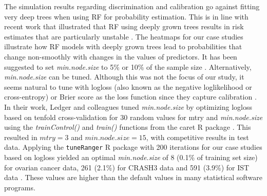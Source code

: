 The simulation results regarding discrimination and calibration go against
fitting very deep trees when using \gls{RF} for probability estimation. This is in
line with recent work that illustrated that \gls{RF} using deeply grown trees results
in risk estimates that are particularly unstable
 \cite{rileyStabilityClinicalPrediction2023}. The heatmaps for our case studies
illustrate how \gls{RF} models with deeply grown trees lead to probabilities that
change non-smoothly with changes in the values of predictors. It has been
suggested to set \textit{min.node.size} to 5\% or 10\% of the sample size
 \cite{malleyProbabilityMachinesConsistent2012,kruppaConsumerCreditRisk2013}.
Alternatively, \textit{min.node.size} can be tuned. Although this was not the
focus of our study, it seems natural to tune with logloss (also known as the
negative loglikelihood or cross-entropy) or Brier score as the loss function
since they capture calibration
 \cite{probstHyperparametersTuningStrategies2019}. In their work, Ledger and
colleagues tuned \textit{min.node.size} by optimizing logloss based on tenfold
cross-validation for 30 random values for mtry and \textit{min.node.size} using
the \textit{trainControl()} and \textit{train()} functions from the caret R package
 \cite{ledgerMulticlassRiskModels2023}. This resulted in $\textit{mtry} = 3$ and
$\textit{min.node.size} = 15$, with competitive results in test data. Applying
the \texttt{tuneRanger} R package with 200 iterations for our case studies based on
logloss yielded an optimal \textit{min.node.size} of 8 (0.1\% of training set
size) for ovarian cancer data, 261 (2.1\%) for \gls{CRASH}3 data and 591 (3.9\%) for
\gls{IST} data \cite{probstHyperparametersTuningStrategies2019}. These values are
higher than the default values in many statistical software programs.

